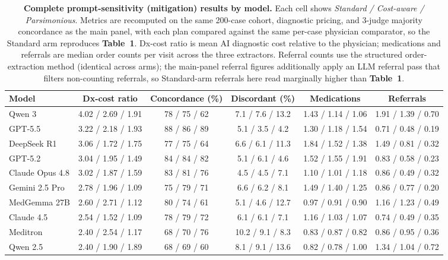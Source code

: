 \begin{table}[ht]
\centering
\footnotesize
\caption{\textbf{Complete prompt-sensitivity (mitigation) results by model.} Each cell shows \emph{Standard / Cost-aware / Parsimonious}. Metrics are recomputed on the same 200-case cohort, diagnostic pricing, and 3-judge majority concordance as the main panel, with each plan compared against the same per-case physician comparator, so the Standard arm reproduces \textbf{Table~1}. Dx-cost ratio is mean AI diagnostic cost relative to the physician; medications and referrals are median order counts per visit across the three extractors. Referral counts use the structured order-extraction method (identical across arms); the main-panel referral figures additionally apply an LLM referral pass that filters non-counting referrals, so Standard-arm referrals here read marginally higher than \textbf{Table~1}.}
\label{tab:mitigation_full}
\begin{tabular}{lccccc}
\toprule
Model & Dx-cost ratio & Concordance (\%) & Discordant (\%) & Medications & Referrals \\
\midrule
Qwen 3 & 4.02 / 2.69 / 1.91 & 78 / 75 / 62 & 7.1 / 7.6 / 13.2 & 1.43 / 1.14 / 1.06 & 1.91 / 1.39 / 0.70 \\
GPT-5.5 & 3.22 / 2.18 / 1.93 & 88 / 86 / 89 & 5.1 / 3.5 / 4.2 & 1.30 / 1.18 / 1.54 & 0.71 / 0.48 / 0.19 \\
DeepSeek R1 & 3.06 / 1.72 / 1.75 & 77 / 75 / 64 & 6.6 / 6.1 / 11.3 & 1.84 / 1.52 / 1.38 & 1.49 / 0.81 / 0.32 \\
GPT-5.2 & 3.04 / 1.95 / 1.49 & 84 / 84 / 82 & 5.1 / 6.1 / 4.6 & 1.52 / 1.55 / 1.91 & 0.83 / 0.58 / 0.23 \\
Claude Opus 4.8 & 3.02 / 1.87 / 1.59 & 83 / 81 / 76 & 4.5 / 4.5 / 7.1 & 1.10 / 1.01 / 1.18 & 0.86 / 0.49 / 0.32 \\
Gemini 2.5 Pro & 2.78 / 1.96 / 1.09 & 75 / 79 / 71 & 6.6 / 6.2 / 8.1 & 1.49 / 1.40 / 1.25 & 0.86 / 0.77 / 0.20 \\
MedGemma 27B & 2.60 / 2.71 / 1.12 & 80 / 74 / 61 & 5.1 / 4.6 / 12.7 & 0.97 / 0.91 / 0.90 & 1.16 / 1.23 / 0.49 \\
Claude 4.5 & 2.54 / 1.52 / 1.09 & 78 / 79 / 72 & 6.1 / 6.1 / 7.1 & 1.16 / 1.03 / 1.07 & 0.74 / 0.49 / 0.35 \\
Meditron & 2.40 / 2.54 / 1.17 & 68 / 70 / 76 & 10.2 / 9.1 / 8.3 & 0.83 / 0.87 / 0.82 & 0.86 / 0.95 / 0.36 \\
Qwen 2.5 & 2.40 / 1.90 / 1.89 & 68 / 69 / 60 & 8.1 / 9.1 / 13.6 & 0.82 / 0.78 / 1.00 & 1.34 / 1.04 / 0.72 \\

\end{tabular}
\end{table}
